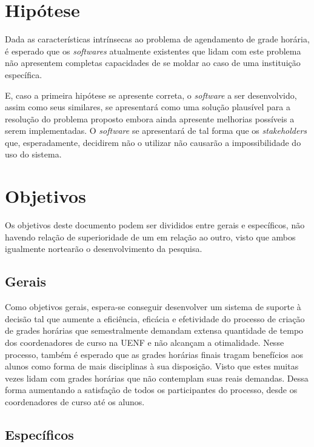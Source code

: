\section{Hipótese} \label{sec:Hipótese} %

Dada as características intrínsecas ao problema de agendamento de grade horária, é esperado que os \textit{softwares} atualmente existentes que lidam com este problema não apresentem completas capacidades de se moldar ao caso de uma instituição específica.

E, caso a primeira hipótese se apresente correta, o \textit{software} a ser desenvolvido, assim como seus similares, se apresentará como uma solução plausível para a resolução do problema proposto embora ainda apresente melhorias possíveis a serem implementadas. O \textit{software} se apresentará de tal forma que os \textit{stakeholders} que, esperadamente, decidirem não o utilizar não causarão a impossibilidade do uso do sistema.

\section{Objetivos} \label{sec:Objetivos} %

Os objetivos deste documento podem ser divididos entre gerais e específicos, não havendo relação de superioridade de um em relação ao outro, visto que ambos igualmente nortearão o desenvolvimento da pesquisa.

\subsection{Gerais} \label{subsec:Gerais} %

Como objetivos gerais, espera-se conseguir desenvolver um sistema de suporte à decisão tal que aumente a eficiência, eficácia e efetividade do processo de criação de grades horárias que semestralmente demandam extensa quantidade de tempo dos coordenadores de curso na UENF e não alcançam a otimalidade. Nesse processo, também é esperado que as grades horárias finais tragam benefícios aos alunos como forma de mais disciplinas à sua disposição. Visto que estes muitas vezes lidam com grades horárias que não contemplam suas reais demandas. Dessa forma aumentando a satisfação de todos os participantes do processo, desde os coordenadores de curso até os alunos.

\subsection{Específicos} \label{subsec: EspeEspecíficos} %

